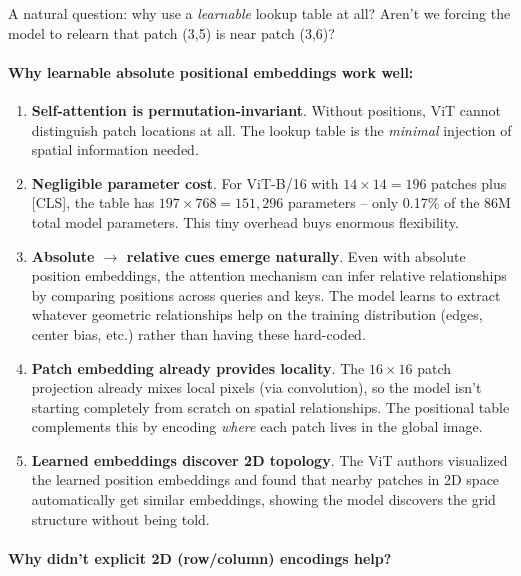\documentclass{article}
\begin{document}
\begin{tcolorbox}[colback=blue!5!white, colframe=blue!50!black, title=Are We Wasting Learning on Already-Known Spatial Proximity?]
A natural question: why use a \textit{learnable} lookup table at all? Aren't we forcing the model to relearn that patch (3,5) is near patch (3,6)?

\paragraph{Why learnable absolute positional embeddings work well:}

\begin{enumerate}
\item \textbf{Self-attention is permutation-invariant}. Without positions, ViT cannot distinguish patch locations at all. The lookup table is the \textit{minimal} injection of spatial information needed.

\item \textbf{Negligible parameter cost}. For ViT-B/16 with $14 \times 14 = 196$ patches plus [CLS], the table has $197 \times 768 = 151{,}296$ parameters -- only 0.17\% of the 86M total model parameters. This tiny overhead buys enormous flexibility.

\item \textbf{Absolute $\rightarrow$ relative cues emerge naturally}. Even with absolute position embeddings, the attention mechanism can infer relative relationships by comparing positions across queries and keys. The model learns to extract whatever geometric relationships help on the training distribution (edges, center bias, etc.) rather than having these hard-coded.

\item \textbf{Patch embedding already provides locality}. The $16 \times 16$ patch projection already mixes local pixels (via convolution), so the model isn't starting completely from scratch on spatial relationships. The positional table complements this by encoding \textit{where} each patch lives in the global image.

\item \textbf{Learned embeddings discover 2D topology}. The ViT authors visualized the learned position embeddings and found that nearby patches in 2D space automatically get similar embeddings, showing the model discovers the grid structure without being told.
\end{enumerate}

\paragraph{Why didn't explicit 2D (row/column) encodings help?}


\end{tcolorbox}
\end{document}
